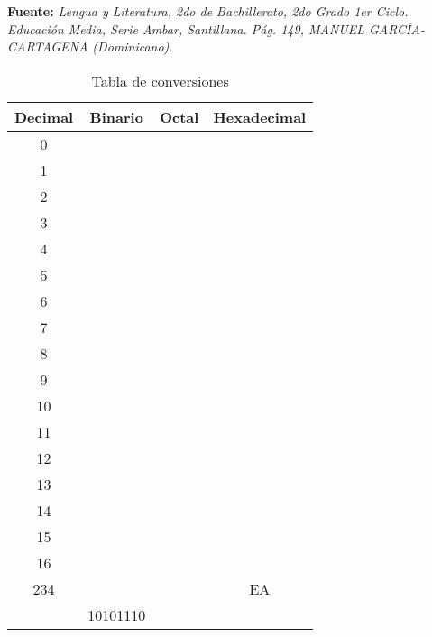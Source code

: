 \documentclass[12pt]{article}
\begin{document}
\begin{enumerate}
\begin{enumerate}
\begin{itemize}
                \end{itemize}

                \textbf{Fuente:} \emph{Lengua y Literatura, 2do de
                Bachillerato, 2do Grado 1er Ciclo. Educación Media, Serie
                Ambar, Santillana. Pág. 149, MANUEL GARCÍA-CARTAGENA
                (Dominicano).}

    \end{enumerate}

\end{enumerate}

\begin{table}[h]

    \centering

    \caption{Tabla de conversiones}
    \label{tablaConversiones}

    \begin{tabular}{ | c | c | c | c | }
        \hline
        Decimal & Binario & Octal & Hexadecimal \\
        \hline
        0 & \hspace{8em} & \hspace{6em} & \hspace{6em} \\
        \hline
        1 & & & \\
        \hline
        2 & & & \\
        \hline
        3 & & & \\
        \hline
        4 & & & \\
        \hline
        5 & & & \\
        \hline
        6 & & & \\
        \hline
        7 & & & \\
        \hline
        8 & & & \\
        \hline
        9 & & & \\
        \hline
        10 & & & \\
        \hline
        11 & & & \\
        \hline
        12 & & & \\
        \hline
        13 & & & \\
        \hline
        14 & & & \\
        \hline
        15 & & & \\
        \hline
        16 & & & \\
        \hline
        234 & & & EA \\
        \hline
        \hspace{6em} & 10101110 & & \\

\end{tabular}
\end{table}
\end{document}
